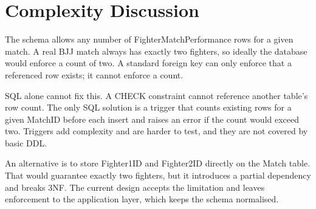 \documentclass[conference,9pt]{IEEEtran}
\begin{document}
 \section{Complexity Discussion}

The schema allows any number of FighterMatchPerformance rows for a given match. A real BJJ match always has exactly two fighters, so ideally the database would enforce a count of two. A standard foreign key can only enforce that a referenced row exists; it cannot enforce a count.

SQL alone cannot fix this. A CHECK constraint cannot reference another table's row count. The only SQL solution is a trigger that counts existing rows for a given MatchID before each insert and raises an error if the count would exceed two. Triggers add complexity and are harder to test, and they are not covered by basic DDL.

An alternative is to store Fighter1ID and Fighter2ID directly on the Match table. That would guarantee exactly two fighters, but it introduces a partial dependency and breaks 3NF. The current design accepts the limitation and leaves enforcement to the application layer, which keeps the schema normalised.
\end{document}
